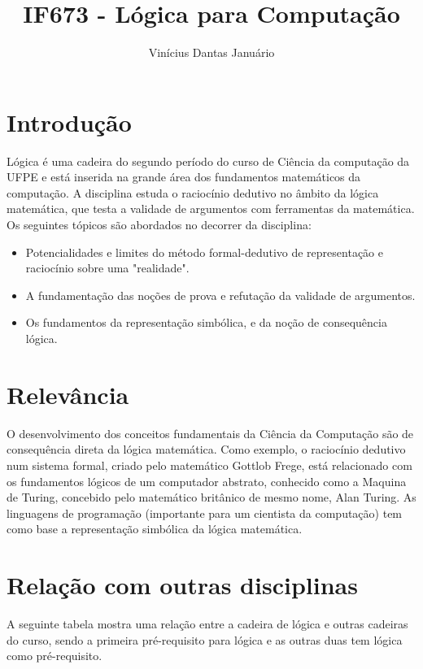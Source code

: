 \documentclass[a4paper]{article}
\title{IF673 - Lógica para Computação}
\author{Vinícius Dantas Januário}
\begin{document}
\maketitle

\section{Introdução}

Lógica é uma cadeira do segundo período do curso de Ciência da computação da UFPE e está inserida na grande área dos fundamentos matemáticos da computação. A disciplina estuda o raciocínio dedutivo no âmbito da lógica matemática, que testa a validade de argumentos com ferramentas da matemática. Os seguintes tópicos são abordados no decorrer da disciplina: 

\begin{itemize}
\item Potencialidades e limites do método formal-dedutivo de representação e raciocínio sobre uma "realidade".
\item A fundamentação das noções de prova e refutação da validade de argumentos.
\item Os fundamentos da representação simbólica, e da noção de consequência lógica.
\end{itemize}

\section{Relevância}

O desenvolvimento dos conceitos fundamentais da Ciência da Computação são de consequência direta da lógica matemática. Como exemplo, o raciocínio dedutivo num sistema formal, criado pelo matemático Gottlob Frege, está relacionado com os fundamentos lógicos de um computador abstrato, conhecido como a Maquina de Turing, concebido pelo matemático britânico de mesmo nome, Alan Turing. As linguagens de programação (importante para um cientista da computação) tem como base a representação simbólica da lógica matemática.

\section{Relação com outras disciplinas}

A seguinte tabela mostra uma relação entre a cadeira de lógica e outras cadeiras do curso, sendo a primeira pré-requisito para lógica e as outras duas tem lógica como pré-requisito.
\end{document}
